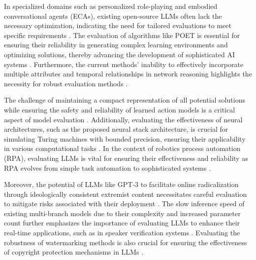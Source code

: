 In specialized domains such as personalized role-playing and embodied conversational agents (ECAs), existing open-source LLMs often lack the necessary optimization, indicating the need for tailored evaluations to meet specific requirements . The evaluation of algorithms like POET is essential for ensuring their reliability in generating complex learning environments and optimizing solutions, thereby advancing the development of sophisticated AI systems \cite{wang2019pairedopenendedtrailblazerpoet}. Furthermore, the current methods' inability to effectively incorporate multiple attributes and temporal relationships in network reasoning highlights the necessity for robust evaluation methods \cite{shakarian2022reasoningcomplexnetworkslogic}.



The challenge of maintaining a compact representation of all potential solutions while ensuring the safety and reliability of learned action models is a critical aspect of model evaluation \cite{aineto2024actionmodellearningguarantees}. Additionally, evaluating the effectiveness of neural architectures, such as the proposed neural stack architecture, is crucial for simulating Turing machines with bounded precision, ensuring their applicability in various computational tasks \cite{stogin2022provablystableneuralnetwork}. In the context of robotics process automation (RPA), evaluating LLMs is vital for ensuring their effectiveness and reliability as RPA evolves from simple task automation to sophisticated systems \cite{pandy2024advancementsroboticsprocessautomation}.



Moreover, the potential of LLMs like GPT-3 to facilitate online radicalization through ideologically consistent extremist content necessitates careful evaluation to mitigate risks associated with their deployment \cite{mcguffie2020radicalizationrisksgpt3advanced}. The slow inference speed of existing multi-branch models due to their complexity and increased parameter count further emphasizes the importance of evaluating LLMs to enhance their real-time applications, such as in speaker verification systems \cite{ma2021repworksspeakerverification}. Evaluating the robustness of watermarking methods is also crucial for ensuring the effectiveness of copyright protection mechanisms in LLMs \cite{wang2024espewrobustcopyrightprotection}.



